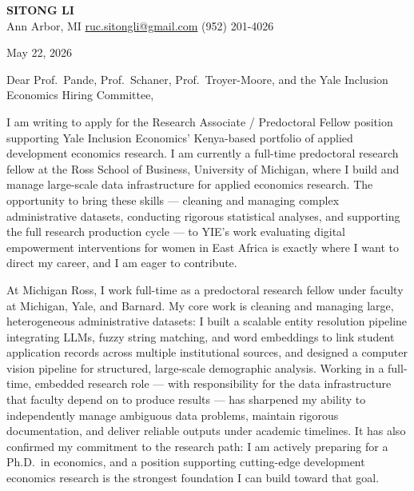 \documentclass[12pt]{article}
\begin{document}
\begin{center}
  {\LARGE\textbf{\textcolor{accent}{SITONG LI}}} \\[4pt]
  \small Ann Arbor, MI
  \;\textbullet\;
  \href{mailto:ruc.sitongli@gmail.com}{ruc.sitongli@gmail.com}
  \;\textbullet\;
  (952) 201-4026
\end{center}

\vspace{1em}

\noindent May 22, 2026

\vspace{1em}

\noindent Dear Prof.\ Pande, Prof.\ Schaner, Prof.\ Troyer-Moore, and the Yale Inclusion Economics Hiring Committee,

\vspace{1em}

I am writing to apply for the Research Associate / Predoctoral Fellow position supporting Yale Inclusion Economics' Kenya-based portfolio of applied development economics research. I am currently a full-time predoctoral research fellow at the Ross School of Business, University of Michigan, where I build and manage large-scale data infrastructure for applied economics research. The opportunity to bring these skills --- cleaning and managing complex administrative datasets, conducting rigorous statistical analyses, and supporting the full research production cycle --- to YIE's work evaluating digital empowerment interventions for women in East Africa is exactly where I want to direct my career, and I am eager to contribute.

At Michigan Ross, I work full-time as a predoctoral research fellow under faculty at Michigan, Yale, and Barnard. My core work is cleaning and managing large, heterogeneous administrative datasets: I built a scalable entity resolution pipeline integrating LLMs, fuzzy string matching, and word embeddings to link student application records across multiple institutional sources, and designed a computer vision pipeline for structured, large-scale demographic analysis. Working in a full-time, embedded research role --- with responsibility for the data infrastructure that faculty depend on to produce results --- has sharpened my ability to independently manage ambiguous data problems, maintain rigorous documentation, and deliver reliable outputs under academic timelines. It has also confirmed my commitment to the research path: I am actively preparing for a Ph.D.\ in economics, and a position supporting cutting-edge development economics research is the strongest foundation I can build toward that goal.
\end{document}
